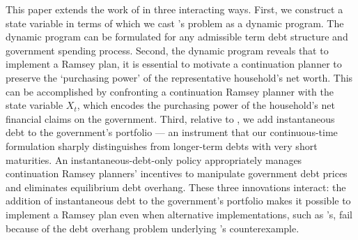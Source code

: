 \documentclass[12pt]{article}
\newcommand{\NW}[1]{{\textcolor{blue}{#1}}}
\begin{document}
{%
This paper extends the work of \cite{JiangSargentWang2025} in three interacting ways. 
First, we construct a state variable in terms of which we cast \citeauthor{LucasStokey1983}'s problem as a dynamic program. The dynamic program can be formulated 
for any admissible term debt structure and  government spending process. %
Second, the dynamic program reveals that to implement a Ramsey plan, it is essential to motivate a continuation planner to preserve the `purchasing power' of the representative household's net worth. This can be accomplished by confronting a continuation Ramsey planner with the state variable 
$X_t$, which encodes the purchasing power of the household's net financial claims on the government.  
Third, 
relative to \cite{LucasStokey1983}, we add instantaneous debt to the government's portfolio --- an instrument that our continuous-time formulation sharply distinguishes from longer-term debts with very short maturities.
An instantaneous-debt-only policy appropriately manages continuation Ramsey planners' incentives to manipulate government debt prices and eliminates equilibrium debt overhang. 
These three innovations interact: the addition of instantaneous debt to the government's portfolio
makes it possible to implement a Ramsey plan even when alternative implementations, such as \citeauthor{LucasStokey1983}'s, fail because of the debt overhang problem underlying \citeauthor{debortoli2021optimal}'s counterexample. %

}
\end{document}
